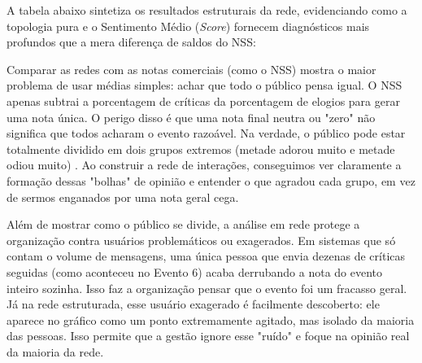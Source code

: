 \documentclass[sigconf]{webmedia}
\begin{document}
A tabela abaixo sintetiza os resultados estruturais da rede, evidenciando como a topologia pura e o Sentimento Médio (\textit{Score}) fornecem diagnósticos mais profundos que a mera diferença de saldos do NSS:

\begin{table}[H]
\centering
{}
\caption{Comparativo Geral Estrutural dos Eventos Analisados.}
\label{tab:comparativo}
\end{table}

Comparar as redes com as notas comerciais (como o NSS) mostra o maior problema de usar médias simples: achar que todo o público pensa igual. O NSS apenas subtrai a porcentagem de críticas da porcentagem de elogios para gerar uma nota única. O perigo disso é que uma nota final neutra ou "zero" não significa que todos acharam o evento razoável. Na verdade, o público pode estar totalmente dividido em dois grupos extremos (metade adorou muito e metade odiou muito) \cite{easley}. Ao construir a rede de interações, conseguimos ver claramente a formação dessas "bolhas" de opinião e entender o que agradou cada grupo, em vez de sermos enganados por uma nota geral cega.

Além de mostrar como o público se divide, a análise em rede protege a organização contra usuários problemáticos ou exagerados. Em sistemas que só contam o volume de mensagens, uma única pessoa que envia dezenas de críticas seguidas (como aconteceu no Evento 6) acaba derrubando a nota do evento inteiro sozinha. Isso faz a organização pensar que o evento foi um fracasso geral. Já na rede estruturada, esse usuário exagerado é facilmente descoberto: ele aparece no gráfico como um ponto extremamente agitado, mas isolado da maioria das pessoas. Isso permite que a gestão ignore esse "ruído" e foque na opinião real da maioria da rede.
\end{document}
